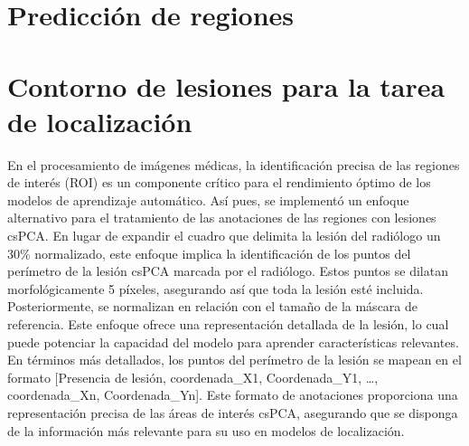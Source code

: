 \section{Predicción de regiones}






\section{Contorno de lesiones para la tarea de localización}

En el procesamiento de imágenes médicas, la identificación precisa de las regiones de interés (ROI) es un componente crítico para el rendimiento óptimo de los modelos de aprendizaje automático. Así pues, se implementó un enfoque alternativo para el tratamiento de las anotaciones de las regiones con lesiones csPCA. En lugar de expandir el cuadro que delimita la lesión del radiólogo un 30\% normalizado, este enfoque implica la identificación de los puntos del perímetro de la lesión csPCA marcada por el radiólogo. Estos puntos se dilatan morfológicamente 5 píxeles, asegurando así que toda la lesión esté incluida. Posteriormente, se normalizan en relación con el tamaño de la máscara de referencia. Este enfoque ofrece una representación detallada de la lesión, lo cual puede potenciar la capacidad del modelo para aprender características relevantes. En términos más detallados, los puntos del perímetro de la lesión se mapean en el formato [Presencia de lesión, coordenada\_X1, Coordenada\_Y1, …, coordenada\_Xn, Coordenada\_Yn]. Este formato de anotaciones proporciona una representación precisa de las áreas de interés csPCA, asegurando que se disponga de la información más relevante para su uso en modelos de localización.





